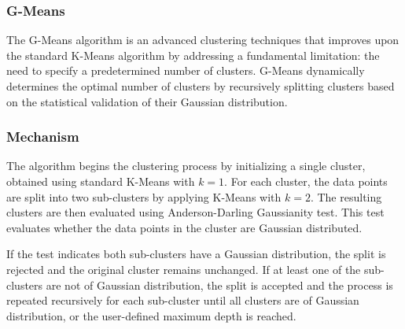 


\subsubsection{G-Means}
\label{subsec:gmeansdiscussion}

The G-Means algorithm is an advanced clustering techniques that improves upon the standard K-Means algorithm by addressing
a fundamental limitation: the need to specify a predetermined number of clusters.
G-Means dynamically determines the optimal number of clusters by recursively splitting clusters based on the
statistical validation of their Gaussian distribution. \cite{gmeans}

\subsubsection*{Mechanism}

The algorithm begins the clustering process by initializing a single cluster, obtained using standard K-Means with \(k=1\).
For each cluster, the data points are split into two sub-clusters by applying K-Means with \(k=2\).
The resulting clusters are then evaluated using Anderson-Darling Gaussianity test. This test evaluates whether the data points in the cluster
are Gaussian distributed. \cite{gmeans}

If the test indicates both sub-clusters have a Gaussian distribution, the split is rejected and the original cluster remains unchanged.
If at least one of the sub-clusters are not of Gaussian distribution, the split is accepted and the process is repeated recursively for each sub-cluster
until all clusters are of Gaussian distribution, or the user-defined maximum depth is reached. \cite{gmeans}

